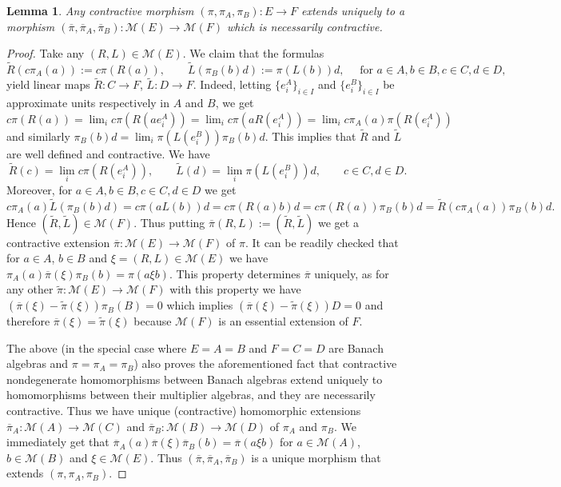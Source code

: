 \documentclass[11 pt, leqno]{amsart}
\numberwithin{equation}{section}
\theoremstyle{plain}
\newtheorem {lem} [thm]{Lemma}
\theoremstyle{definition}
\newcommand{\M}{\mathcal M}
\begin{document}
\begin{lem}\label{lem:extensions_lemma}
Any contractive morphism $(\pi,\pi_A,\pi_B):E\to F$ extends uniquely to a morphism $(\overline{\pi}, \overline{\pi}_A, \overline{\pi}_B):\M(E)\to \M(F)$ which is necessarily contractive.
\end{lem}
\begin{proof}
Take any $(R,L)\in \M(E)$. 
We claim that the formulas
\[
    \widetilde{R}(c\pi_A(a)):=c\pi(R(a)), \qquad \widetilde{L}(\pi_B(b)d):=\pi(L(b))d,\quad\mbox{ for $a\in A, b\in B, c\in C, d\in D$,}
\]
yield linear maps $\widetilde{R}:C\to F$, $\widetilde{L}:D\to F$. 
Indeed, letting $\{e_i^A\}_{i \in I}$ and $\{e_i^B\}_{i \in I}$ be approximate units respectively in $A$ and $B$, we get $c\pi(R(a))=\lim_{i} c\pi(R(ae_i^A))=\lim_{i} c\pi(aR(e_i^A))=\lim_{i} c\pi_A(a)\pi(R(e_i^A))$ and similarly  $\pi_B(b)d=\lim_{i}\pi(L(e_i^B))\pi_B(b)d$. 
This implies that $\widetilde{R}$ and $\widetilde{L}$ are well defined and contractive. 
We have 
\[
    \widetilde{R}(c)=\lim_{i} c \pi(R(e_i^A)), \qquad \widetilde{L}(d)=\lim_{i} \pi(L(e_i^B)) d, \qquad c\in C, d\in D.  
\]
Moreover, for $a\in A, b\in B, c\in C, d\in D$ we get
\[
    c\pi_A(a) \widetilde{L}(\pi_B(b)d) = c\pi(aL(b))d = c\pi(R(a)b)d= c\pi(R(a))\pi_B(b)d = \widetilde{R}(c\pi_A(a)) \pi_B(b)d.
\]
Hence $(\widetilde{R},\widetilde{L})\in \M(F)$. 
Thus putting $\overline{\pi}(R,L):=(\widetilde{R},\widetilde{L})$ we get a contractive  extension $\overline{\pi}:\M(E)\to \M(F)$ of $\pi$.
It can be readily checked that for $a\in A$, $b\in B$ and $\xi=(R,L)\in \M(E)$ we have $\pi_A(a)\overline{\pi}(\xi)\pi_B(b)=\pi(a\xi b)$. 
This property determines $\overline{\pi}$ uniquely, as for any other $\tilde{\pi}:\M(E)\to \M(F)$ with this property we have $(\overline{\pi}(\xi)-\tilde{\pi}(\xi))\pi_B(B)=0$ which implies $(\overline{\pi}(\xi)-\tilde{\pi}(\xi))D=0$ and therefore $\overline{\pi}(\xi)=\tilde{\pi}(\xi)$ because $\M(F)$ is an essential extension of $F$.

The above (in the special case where $E=A=B$ and $F=C=D$ are Banach algebras and $\pi=\pi_A=\pi_B$) also proves the aforementioned fact that contractive nondegenerate homomorphisms between Banach algebras extend uniquely to homomorphisms between their multiplier algebras, and they are necessarily contractive. 
Thus we have unique (contractive) homomorphic extensions $\overline{\pi}_A:\M(A)\to \M(C)$ and $\overline{\pi}_B:\M(B)\to \M(D)$ of  $\pi_A$ and $\pi_B$. We immediately get that $\overline{\pi}_A(a)\overline{\pi}(\xi)\overline{\pi}_B(b)=\overline{\pi}(a\xi b)$ for $a\in \M(A)$, $b\in \M(B)$ and $\xi\in \M(E)$. 
Thus $(\overline{\pi},\overline{\pi}_A,\overline{\pi}_B)$ is a unique morphism that extends $(\pi,\pi_A,\pi_B)$.
\end{proof}
\end{document}
